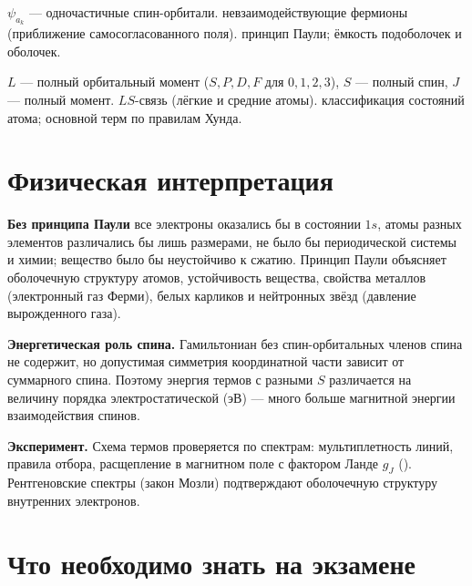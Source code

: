  {$\psi_{a_k}$ — одночастичные спин-орбитали.}
 {невзаимодействующие фермионы (приближение самосогласованного поля).}
 {принцип Паули; ёмкость подоболочек и оболочек.}

 {$L$ — полный орбитальный момент ($S,P,D,F$ для $0,1,2,3$), $S$ — полный спин, $J$ — полный момент.}
 {$LS$-связь (лёгкие и средние атомы).}
 {классификация состояний атома; основной терм по правилам Хунда.}

\section{Физическая интерпретация}

\textbf{Без принципа Паули} все электроны оказались бы в состоянии $1s$, атомы разных элементов различались бы
лишь размерами, не было бы периодической системы и химии; вещество было бы неустойчиво к сжатию.
Принцип Паули объясняет оболочечную структуру атомов, устойчивость вещества, свойства металлов
(электронный газ Ферми), белых карликов и нейтронных звёзд (давление вырожденного газа).

\textbf{Энергетическая роль спина.} Гамильтониан без спин-орбитальных членов спина не содержит, но
допустимая симметрия координатной части зависит от суммарного спина. Поэтому энергия термов с разными $S$
различается на величину порядка электростатической (эВ) — много больше магнитной энергии взаимодействия спинов.

\textbf{Эксперимент.} Схема термов проверяется по спектрам: мультиплетность линий, правила отбора, расщепление
в магнитном поле с фактором Ланде $g_J$ (). Рентгеновские спектры (закон Мозли) подтверждают оболочечную
структуру внутренних электронов.

\section{Что необходимо знать на экзамене}

